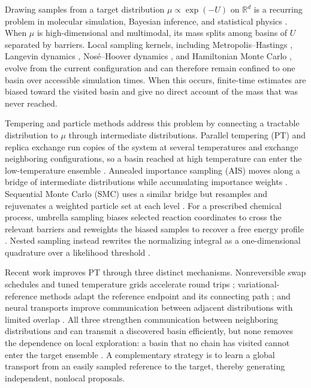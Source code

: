 \documentclass{article}
\begin{document}
Drawing samples from a target distribution $\mu \propto \exp(-U)$ on $\mathbb R^d$ is a recurring problem in molecular simulation, Bayesian inference, and statistical physics \citep{frenkel2002understanding,robert2004monte,landau2014guide}. When $\mu$ is high-dimensional and multimodal, its mass splits among basins of $U$ separated by barriers. Local sampling kernels, including Metropolis--Hastings \citep{metropolis1953equation,hastings1970monte}, Langevin dynamics \citep{langevin1908theorie,leimkuhler2015molecular}, Nos{\'e}--Hoover dynamics \citep{nose1984unified,hoover1985canonical}, and Hamiltonian Monte Carlo \citep{duane1987hybrid}, evolve from the current configuration and can therefore remain confined to one basin over accessible simulation times. When this occurs, finite-time estimates are biased toward the visited basin and give no direct account of the mass that was never reached.

Tempering and particle methods address this problem by connecting a tractable distribution to $\mu$ through intermediate distributions. Parallel tempering (PT) and replica exchange run copies of the system at several temperatures and exchange neighboring configurations, so a basin reached at high temperature can enter the low-temperature ensemble \citep{swendsen1986replica,geyer1991markov,hukushima1996exchange}. Annealed importance sampling (AIS) moves along a bridge of intermediate distributions while accumulating importance weights \citep{neal2001annealed}. Sequential Monte Carlo (SMC) uses a similar bridge but resamples and rejuvenates a weighted particle set at each level \citep{doucet2001introduction,delmoral2006sequential}. For a prescribed chemical process, umbrella sampling biases selected reaction coordinates to cross the relevant barriers and reweights the biased samples to recover a free energy profile \citep{torrie1977umbrella,kastner2011umbrella}. Nested sampling instead rewrites the normalizing integral as a one-dimensional quadrature over a likelihood threshold \citep{skilling2006nested}.

Recent work improves PT through three distinct mechanisms. Nonreversible swap schedules and tuned temperature grids accelerate round trips \citep{syed2022nonreversible}; variational-reference methods adapt the reference endpoint and its connecting path \citep{surjanovic2022variational}; and neural transports improve communication between adjacent distributions with limited overlap \citep{zhang2025accelerated}. All three strengthen communication between neighboring distributions and can transmit a discovered basin efficiently, but none removes the dependence on local exploration: a basin that no chain has visited cannot enter the target ensemble \citep{woodard2009conditions,chehab2024provable}. A complementary strategy is to learn a global transport from an easily sampled reference to the target, thereby generating independent, nonlocal proposals.
\end{document}
